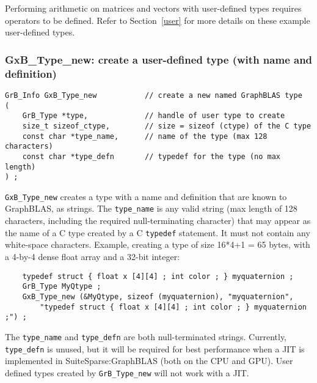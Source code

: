 \documentclass[12pt]{article}
\begin{document}
Performing arithmetic on matrices and vectors with user-defined types requires
operators to be defined.  Refer to Section~\ref{user} for more details on these
example user-defined types.

\subsubsection{{\sf GxB\_Type\_new:} create a user-defined type (with name and definition)}
\label{type_new_named}

\begin{mdframed}[userdefinedwidth=6in]
{\footnotesize
\begin{verbatim}
GrB_Info GxB_Type_new           // create a new named GraphBLAS type
(
    GrB_Type *type,             // handle of user type to create
    size_t sizeof_ctype,        // size = sizeof (ctype) of the C type
    const char *type_name,      // name of the type (max 128 characters)
    const char *type_defn       // typedef for the type (no max length)
) ;
\end{verbatim}
}\end{mdframed}

\verb'GxB_Type_new' creates a type with a name and definition that are known to
GraphBLAS, as strings.  The \verb'type_name' is any valid string (max length of 128
characters, including the required null-terminating character) that may
appear as the name of a C type created by a C \verb'typedef' statement.  It must
not contain any white-space characters.  Example, creating a type of size
16*4+1 = 65 bytes, with a 4-by-4 dense float array and a 32-bit integer:

    {\footnotesize
    \begin{verbatim}
    typedef struct { float x [4][4] ; int color ; } myquaternion ;
    GrB_Type MyQtype ;
    GxB_Type_new (&MyQtype, sizeof (myquaternion), "myquaternion",
        "typedef struct { float x [4][4] ; int color ; } myquaternion ;") ; \end{verbatim}}

The \verb'type_name' and \verb'type_defn' are both null-terminated strings.
Currently, \verb'type_defn' is unused, but it will be required for best
performance when a JIT is implemented in SuiteSparse:GraphBLAS (both on the CPU
and GPU).  User defined types created by \verb'GrB_Type_new' will not work with
a JIT.
\end{document}
